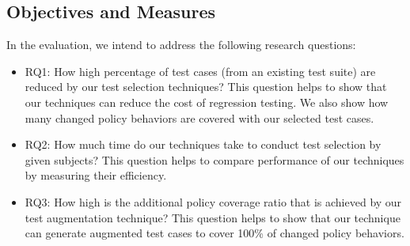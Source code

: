 \subsection{Objectives and Measures}
In the evaluation, we intend to address the following research questions:
\begin{itemize}


	\item RQ1: How high percentage of test cases (from an existing test suite) are reduced by our test selection techniques? This question helps to show that our techniques can 
	reduce the cost of regression testing.
	We also show how many changed policy behaviors are covered with our selected test cases.
	
	
	\item RQ2: How much time do our techniques take to conduct test selection by given subjects? This question helps to compare performance of our techniques by measuring their efficiency.
			
	\item RQ3: How high is the additional policy coverage ratio that is achieved by our test augmentation technique?  This question helps to show that our technique can generate augmented test cases to cover 100\% of changed policy behaviors.
				
\end{itemize}

